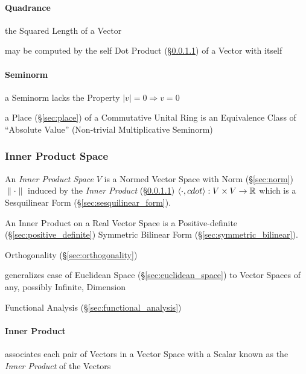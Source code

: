 \paragraph{Quadrance}\label{sec:quadrance}\hfill

the Squared Length of a Vector

may be computed by the self Dot Product (\S\ref{sec:inner_product}) of a Vector
with itself



\paragraph{Seminorm}\label{sec:seminorm}\hfill

a Seminorm lacks the Property $|v| = 0 \Longrightarrow v = 0$

\fist a Place (\S\ref{sec:place}) of a Commutative Unital Ring is an
Equivalence Class of ``Absolute Value'' (Non-trivial Multiplicative Seminorm)



\subsubsection{Inner Product Space}\label{sec:innerproduct_space}

An \emph{Inner Product Space} $V$ is a Normed Vector Space with Norm
(\S\ref{sec:norm}) $\|\cdot\|$ induced by the \emph{Inner Product}
(\S\ref{sec:inner_product}) $\langle{\cdot,cdot}\rangle : V \times V
\rightarrow \mathbb{R}$ which is a Sesquilinear Form
(\S\ref{sec:sesquilinear_form}).

An Inner Product on a Real Vector Space is a Positive-definite
(\S\ref{sec:positive_definite}) Symmetric Bilinear Form
(\S\ref{sec:symmetric_bilinear}).

\fist Orthogonality (\S\ref{sec:orthogonality})

generalizes case of Euclidean Space (\S\ref{sec:euclidean_space}) to
Vector Spaces of any, possibly Infinite, Dimension

Functional Analysis (\S\ref{sec:functional_analysis})



\paragraph{Inner Product}\label{sec:inner_product}\hfill

associates each pair of Vectors in a Vector Space with a Scalar known
as the \emph{Inner Product} of the Vectors

